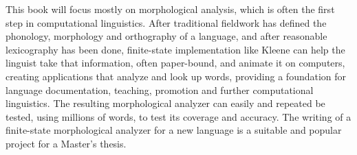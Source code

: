 This book will focus mostly on morphological analysis, which is often the first step in
computational linguistics.  After traditional fieldwork has defined the phonology,
morphology and orthography of a language, and after reasonable lexicography has been done,
finite-state implementation like Kleene can help the linguist take that information, often paper-bound,
and animate it on
computers, creating
applications that analyze and look up words, providing a foundation for language
documentation, teaching, promotion and further computational linguistics.  The resulting
morphological analyzer can easily and repeated be tested, using millions of words, to
test its coverage and accuracy.  The writing of a finite-state
morphological
analyzer for a new language is a suitable and  popular project for a Master's thesis.


